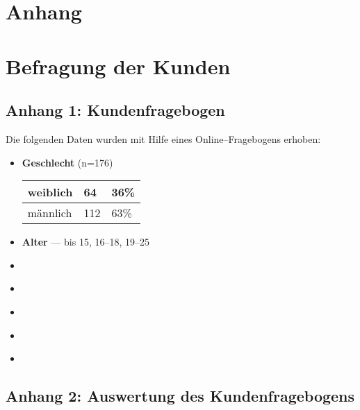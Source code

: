 \appendix
\section*{Anhang}

\section*{Befragung der Kunden}
\label{sec:kundenbefragung}
\subsection*{Anhang 1: Kundenfragebogen}

Die folgenden Daten wurden mit Hilfe eines Online–Fragebogens erhoben:

\begin{itemize}
\item \textbf{Geschlecht} (n=176) \\ 
\begin{tabular}{ | l | l | l | } \hline                       
  weiblich &  64 & 36\%  \\ \hline
  männlich & 112 & 63\%  \\ \hline 
\end{tabular}
\item \textbf{Alter} --- bis 15, 16--18, 19--25
\item \textbf{}
\item \textbf{}
\item \textbf{}
\item \textbf{}
\item \textbf{}

\end{itemize}

\subsection*{Anhang 2: Auswertung des Kundenfragebogens}
